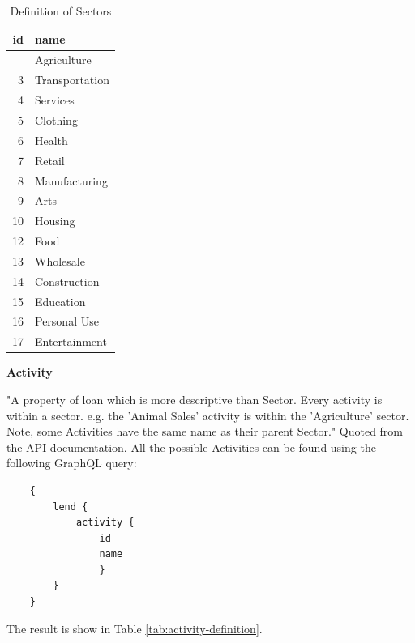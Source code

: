 \begin{longtable}[]{@{}rl@{}}
	\caption{Definition of Sectors}
	\label{tab:sector-definition} \\
	\toprule\noalign{}
	id & name                     \\
	\midrule\noalign{}
	\endhead
	\bottomrule\noalign{}
	\endlastfoot
	1  & Agriculture              \\
	3  & Transportation           \\
	4  & Services                 \\
	5  & Clothing                 \\
	6  & Health                   \\
	7  & Retail                   \\
	8  & Manufacturing            \\
	9  & Arts                     \\
	10 & Housing                  \\
	12 & Food                     \\
	13 & Wholesale                \\
	14 & Construction             \\
	15 & Education                \\
	16 & Personal Use             \\
	17 & Entertainment            \\
\end{longtable}

\textbf{Activity}

"A property of loan which is more descriptive than Sector.
Every activity is within a sector. e.g. the 'Animal Sales' activity is within the 'Agriculture' sector.
Note, some Activities have the same name as their parent Sector."
Quoted from the API documentation.
All the possible Activities can be found using the following GraphQL query:

\begin{lstlisting}
    {
        lend {
            activity {
                id
                name
                }	
        }
    }
\end{lstlisting}

The result is show in Table \ref{tab:activity-definition}.

